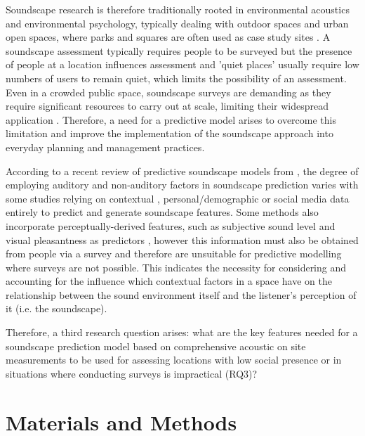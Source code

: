  Soundscape research is therefore traditionally rooted in environmental acoustics and environmental psychology, typically dealing with outdoor spaces \citep{Torresin2020Indoor} and urban open spaces, where parks and squares are often used as case study sites . A soundscape assessment typically requires people to be surveyed but the presence of people at a location influences assessment \citep{Aletta2018Towards} and 'quiet places' usually require low numbers of users to remain quiet, which limits the possibility of an assessment. Even in a crowded public space, soundscape surveys are demanding as they require significant resources to carry out at scale, limiting their widespread application \citep{Mitchell2020Soundscape}. Therefore, a need for a predictive model arises to overcome this limitation and improve the implementation of the soundscape approach into everyday planning and management practices.

 According to a recent review of predictive soundscape models from \citet{Lionello2020systematic}, the degree of employing auditory and non-auditory factors in soundscape prediction varies with some studies relying on contextual \citep{Kajihara2017Imaginary}, personal/demographic \citep{Erfanian2021Psychological}  or social media \citep{Aiello2016Chatty} data entirely to predict and generate soundscape features. Some methods also incorporate perceptually-derived features, such as subjective sound level and visual pleasantness as predictors \citep{Lionello2020systematic}, however this information must also be obtained from people via a survey and therefore are unsuitable for predictive modelling where surveys are not possible. This indicates the necessity for considering and accounting for the influence which contextual factors in a space have on the relationship between the sound environment itself and the listener's perception of it (i.e. the soundscape).

 Therefore, a third research question arises: what are the key features needed for a soundscape prediction model based on comprehensive acoustic on site measurements to be used for assessing locations with low social presence or in situations where conducting surveys is impractical (RQ3)?

\section{Materials and Methods}

